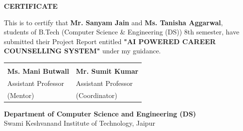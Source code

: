\begin{center}
\LARGE{\textbf{CERTIFICATE}}
\end{center}

\vspace{1cm}
\large
This is to certify that \textbf{Mr. Sanyam Jain} and \textbf{Ms. Tanisha Aggarwal}, students of B.Tech (Computer Science \& Engineering (DS)) 8th semester, have submitted their Project Report entitled \textbf{"AI POWERED CAREER COUNSELLING SYSTEM"} under my guidance.

\vspace{3cm}
\begin{table}[h]
\centering
\begin{tabular}{p{5cm}p{5cm}}
\dotfill & \dotfill \\
\textbf{Ms. Mani Butwall} & \textbf{Mr. Sumit Kumar} \\
Assistant Professor & Assistant Professor \\
(Mentor) & (Coordinator) \\
\end{tabular}
\end{table}

\vspace{2cm}
\noindent
\textbf{Department of Computer Science and Engineering (DS)} \\
Swami Keshvanand Institute of Technology, Jaipur
\clearpage

